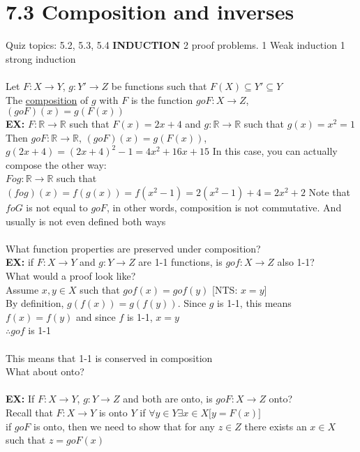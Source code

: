 \documentclass{article}
\begin{document}
 		\section[04/17/18]{7.3 Composition and inverses}
 		Quiz topics: 5.2, 5.3, 5.4 \textbf{INDUCTION} 2 proof problems. 1 Weak induction 1 strong induction\\
 		\\
	 	Let $F:X\rightarrow Y$, $g: Y'\rightarrow Z$ be functions such that $F(X)\subseteq Y'\subseteq Y$\\
	 	The \underline{composition} of $g$ with $F$ is the function $goF: X\rightarrow Z$, $(goF)(x)=g(F(x))$\\
	 	\textbf{EX:} $F:\mathbb{R}\rightarrow\mathbb{R}$ such that $F(x)=2x+4$ and $g:\mathbb{R}\rightarrow\mathbb{R}$ such that $g(x)=x^2=1$\\
	 	Then $goF: \mathbb{R}\rightarrow\mathbb{R}$, $(goF)(x)=g(F(x))$, $g(2x+4)=(2x+4)^2-1=4x^2+16x+15$ In this case, you can actually compose the other way:\\
	 	$Fog:\mathbb{R}\rightarrow\mathbb{R}$ such that $(fog)(x)=f(g(x))= f(x^2-1)=2(x^2-1)+4=2x^2+2$ Note that $foG$ is not equal to $goF$, in other words, composition is not commutative. And usually is not even defined both ways\\
		 \\
		 What function properties are preserved under composition?\\ 
		 \textbf{EX:} if $F:X\rightarrow Y$ and $g:Y\rightarrow Z$ are 1-1 functions, is $gof: X\rightarrow Z$ also 1-1?\\
		 What would a proof look like?\\
		 Assume $x,y\in X$ such that $gof(x) = gof(y)$ [NTS: $x=y$]\\
		 By definition, $g(f(x)) = g(f(y))$. Since $g$ is 1-1, this means $f(x)=f(y)$ and since $f$ is 1-1, $x=y$\\
		 $\therefore gof $ is 1-1\\
		 \\
		 This means that 1-1 is conserved in composition\\
		 What about onto?\\
		 \\
		 \textbf{EX:} If $F:X\rightarrow Y$, $g:Y\rightarrow Z$ and both are onto, is $goF: X\rightarrow Z$ onto?\\
		 Recall that $F:X\rightarrow Y$ is onto $Y$ if $\forall y\in Y\exists x\in X\lbrack y=F(x)\rbrack$\\
		 if $goF$ is onto, then we need to show that for any $z\in Z$ there exists an $x\in X$ such that $z=goF(x)$\\
\end{document}
